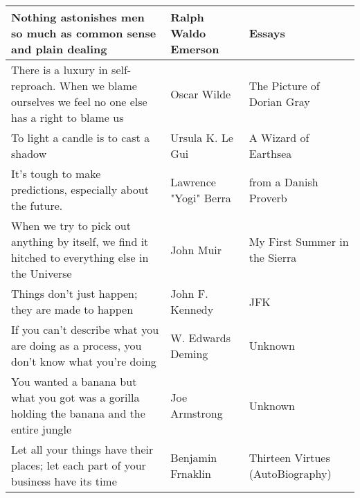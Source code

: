\documentclass{article}
\begin{document}
    \begin{tabularx}{0.8\textwidth} { 
      | >{\centering\arraybackslash}X 
      | >{\centering\arraybackslash}X 
      |  >{\centering\arraybackslash}X |}
        \hline
        Nothing astonishes men so much as common sense and plain dealing
        & Ralph Waldo Emerson
        & Essays \\
    
        \hline
    
        There is a luxury in self-reproach. When we blame ourselves we feel no one else has a right to blame us
        & Oscar Wilde
        & The Picture of Dorian Gray \\
    
        \hline
    
        To light a candle is to cast a shadow
        & Ursula K. Le Gui
        & A Wizard of Earthsea\\
    
        \hline
    
        It's tough to make predictions, especially about the future.
        & Lawrence "Yogi" Berra
        & from a Danish Proverb\\
    
        \hline
    
        When we try to pick out anything by itself, we find it hitched to everything else in the Universe
        & John Muir
        &My First Summer in the Sierra \\
    
        \hline
    
        Things don't just happen; they are made to happen
        & John F. Kennedy
        & JFK\\
    
        \hline
    
        If you can't describe what you are doing as a process, you don't know what you're doing
        & W. Edwards Deming
        & Unknown\\
    
        \hline
    
        You wanted a banana but what you got was a gorilla holding the banana and the entire jungle
        & Joe Armstrong 
        & Unknown\\
    
        \hline
    
        Let all your things have their places; let each part of your business have its time
        & Benjamin Frnaklin
        & Thirteen Virtues (AutoBiography) \\
    
        \hline
    \end{tabularx}
\end{document}
